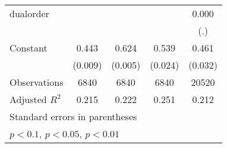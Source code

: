 {\begin{tabular}{l*{4}{c}}
\addlinespace
dualorder           &                     &                     &                     &       0.000         \\
                    &                     &                     &                     &         (.)         \\
\addlinespace
Constant            &       0.443\sym{***}&       0.624\sym{***}&       0.539\sym{***}&       0.461\sym{***}\\
                    &     (0.009)         &     (0.005)         &     (0.024)         &     (0.032)         \\
\midrule
Observations        &        6840         &        6840         &        6840         &       20520         \\
Adjusted \(R^{2}\)  &       0.215         &       0.222         &       0.251         &       0.212         \\
\bottomrule
\multicolumn{5}{l}{\footnotesize Standard errors in parentheses}\\
\multicolumn{5}{l}{\footnotesize \sym{*} \(p<0.1\), \sym{**} \(p<0.05\), \sym{***} \(p<0.01\)}\\
\end{tabular}
}
